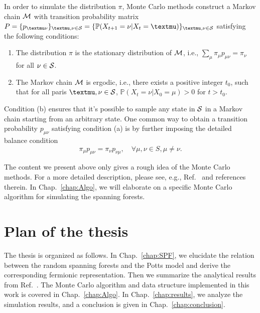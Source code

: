 In order to simulate the distribution $\pi$, Monte Carlo methods construct a Markov chain ${\mathcal M}$ with transition probability matrix 
$P = \{p_{\mu\nu}\}_{\mu, \nu \in \scrS} = \{\mathbb{P}(X_{t+1} = \nu|X_{t} = \mu)\}_{\mu, \nu\in \scrS}$ satisfying the following conditions:
\begin{enumerate}[label=(\alph*)]
	\item The distribution $\pi$ is the stationary distribution of ${\mathcal M}$, i.e.,  $\sum_\mu \pi_{\mu} p_{\mu\nu} = \pi_\nu$ for all $\nu\in {\mathcal S}$.
	\item The Markov chain ${\mathcal M}$ is ergodic, i.e., there exists a positive integer $t_0$, such that for all paris $\mu, \nu\in \scrS$, 
	$\mathbb{P}(X_t = \nu|X_0 = \mu) > 0$ for $t > t_0$.
\end{enumerate}
Condition (b) ensures that it's possible to sample any state in ${\mathcal S}$ in a Markov chain starting from an arbitrary state.
One common way to obtain a transition probability $p_{\mu\nu}$ satisfying condition (a) is by further imposing the detailed balance condition
\begin{equation}
	\pi_{\mu} p_{\mu\nu} = \pi_{\nu} p_{\nu \mu}, \quad \forall \mu, \nu \in S, \mu \neq \nu.
\end{equation}

The content we present above only gives a rough idea of the Monte Carlo methods. For a more detailed description, please see, e.g., Ref.~ and references therein.
In Chap.~\ref{chap:Algo}, we will elaborate on a specific Monte Carlo algorithm for simulating the spanning forests.

\section{Plan of the thesis}
The thesis is organized as follows. In Chap.~\ref{chap:SPF}, we elucidate the relation between the random spanning forests and
the Potts model and derive the corresponding fermionic representation. Then we summarize the analytical results from Ref.~.
The Monte Carlo algorithm and data structure implemented in this work is covered in Chap.~\ref{chap:Algo}. In Chap.~\ref{chap:results}, we analyze the simulation results, and a conclusion is given in Chap.~\ref{chap:conclusion}.


